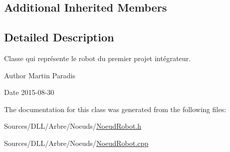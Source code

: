 \subsection*{Additional Inherited Members}


\subsection{Detailed Description}
Classe qui représente le robot du premier projet intégrateur. 

\begin{DoxyAuthor}{Author}
Martin Paradis 
\end{DoxyAuthor}
\begin{DoxyDate}{Date}
2015-\/08-\/30 
\end{DoxyDate}


The documentation for this class was generated from the following files\+:\begin{DoxyCompactItemize}
\item 
Sources/\+D\+L\+L/\+Arbre/\+Noeuds/\hyperlink{_noeud_robot_8h}{Noeud\+Robot.\+h}\item 
Sources/\+D\+L\+L/\+Arbre/\+Noeuds/\hyperlink{_noeud_robot_8cpp}{Noeud\+Robot.\+cpp}\end{DoxyCompactItemize}
